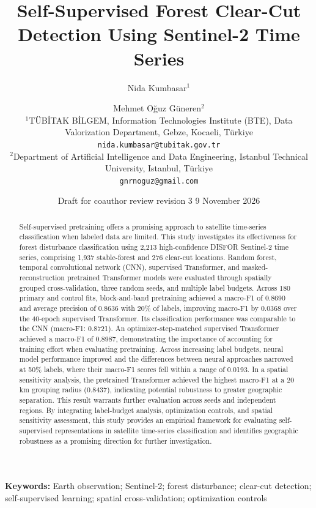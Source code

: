 \documentclass[11pt,a4paper]{article}
\title{\LARGE Self-Supervised Forest Clear-Cut Detection Using Sentinel-2 Time Series}
\author{Nida Kumbasar$^{1}$ \and Mehmet Oğuz Güneren$^{2}$\\[6pt]
\small $^{1}$TÜBİTAK BİLGEM, Information Technologies Institute (BTE), Data Valorization Department, Gebze, Kocaeli, Türkiye \\
\small \texttt{nida.kumbasar@tubitak.gov.tr}\\[3pt]
\small $^{2}$Department of Artificial Intelligence and Data Engineering, Istanbul Technical University, Istanbul, Türkiye \\
\small \texttt{gnrnoguz@gmail.com}}
\date{\small Draft for coauthor review \textbullet{} revision 3 \textbullet{} 9 November 2026}
\begin{document}
\maketitle

\begin{abstract}
Self-supervised pretraining offers a promising approach to satellite time-series classification when labeled data are limited. This study investigates its effectiveness for forest disturbance classification using 2,213 high-confidence DISFOR Sentinel-2 time series, comprising 1,937 stable-forest and 276 clear-cut locations. Random forest, temporal convolutional network (CNN), supervised Transformer, and masked-reconstruction pretrained Transformer models were evaluated through spatially grouped cross-validation, three random seeds, and multiple label budgets. Across 180 primary and control fits, block-and-band pretraining achieved a macro-F1 of 0.8690 and average precision of 0.8636 with 20\% of labels, improving macro-F1 by 0.0368 over the 40-epoch supervised Transformer. Its classification performance was comparable to the CNN (macro-F1: 0.8721). An optimizer-step-matched supervised Transformer achieved a macro-F1 of 0.8987, demonstrating the importance of accounting for training effort when evaluating pretraining. Across increasing label budgets, neural model performance improved and the differences between neural approaches narrowed at 50\% labels, where their macro-F1 scores fell within a range of 0.0193. In a spatial sensitivity analysis, the pretrained Transformer achieved the highest macro-F1 at a 20 km grouping radius (0.8437), indicating potential robustness to greater geographic separation. This result warrants further evaluation across seeds and independent regions. By integrating label-budget analysis, optimization controls, and spatial sensitivity assessment, this study provides an empirical framework for evaluating self-supervised representations in satellite time-series classification and identifies geographic robustness as a promising direction for further investigation.

\end{abstract}
\noindent\textbf{Keywords:} Earth observation; Sentinel-2; forest disturbance; clear-cut detection; self-supervised learning; spatial cross-validation; optimization controls
\end{document}
